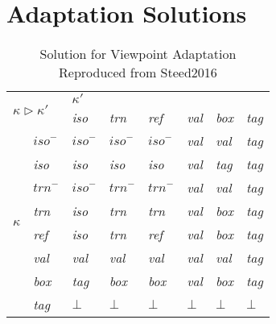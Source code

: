 \chapter{Adaptation Solutions} \label{appendix:adaptation}

\begin{table}[H]
\centering
\begin{tabular}{ll|llllll}
\multicolumn{2}{l|}{\multirow{2}{*}{$\kappa \triangleright \kappa'$}} & \multicolumn{6}{l}{\hfill$\kappa'$\hfill}                                                                \\
\multicolumn{2}{l|}{}                                            & \textit{iso}  & \textit{trn}  & \textit{ref}  & \textit{val} & \textit{box} & \textit{tag} \\ \hline
\multirow{8}{*}{$\kappa$}              & $\textit{iso}^-$       & $\textit{iso}^-$ & $\textit{iso}^-$ & $\textit{iso}^-$ & \textit{val} & \textit{val} & \textit{tag} \\ \cline{2-8} 
                                    & \textit{iso}               & \textit{iso}  & \textit{iso}  & \textit{iso}  & \textit{val} & \textit{tag} & \textit{tag} \\ \cline{2-8} 
                                    & $\textit{trn}^-$              & $\textit{iso}^-$ & $\textit{trn}^-$ & $\textit{trn}^-$ & \textit{val} & \textit{val} & \textit{tag} \\ \cline{2-8} 
                                    & \textit{trn}               & \textit{iso}  & \textit{trn}  & \textit{trn}  & \textit{val} & \textit{box} & \textit{tag} \\ \cline{2-8} 
                                    & \textit{ref}               & \textit{iso}  & \textit{trn}  & \textit{ref}  & \textit{val} & \textit{box} & \textit{tag} \\ \cline{2-8} 
                                    & \textit{val}               & \textit{val}  & \textit{val}  & \textit{val}  & \textit{val} & \textit{val} & \textit{tag} \\ \cline{2-8} 
                                    & \textit{box}               & \textit{tag}  & \textit{box}  & \textit{box}  & \textit{val} & \textit{box} & \textit{tag} \\ \cline{2-8} 
                                    & \textit{tag}               & $\bot$        & $\bot$        & $\bot$        & $\bot$       & $\bot$       & $\bot$      
\end{tabular}
\caption{Solution for Viewpoint Adaptation \\ Reproduced from Steed2016}
\end{table}


